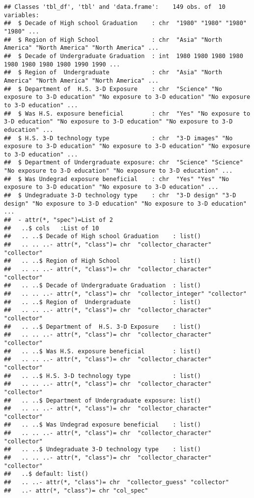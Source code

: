 \documentclass[]{article}
\begin{document}
\begin{verbatim}
## Classes 'tbl_df', 'tbl' and 'data.frame':    149 obs. of  10 variables:
##  $ Decade of High school Graduation    : chr  "1980" "1980" "1980" "1980" ...
##  $ Region of High School               : chr  "Asia" "North America" "North America" "North America" ...
##  $ Decade of Undergraduate Graduation  : int  1980 1980 1980 1980 1980 1980 1980 1980 1990 1990 ...
##  $ Region of  Undergraduate            : chr  "Asia" "North America" "North America" "North America" ...
##  $ Department of  H.S. 3-D Exposure    : chr  "Science" "No exposure to 3-D education" "No exposure to 3-D education" "No exposure to 3-D education" ...
##  $ Was H.S. exposure beneficial        : chr  "Yes" "No exposure to 3-D education" "No exposure to 3-D education" "No exposure to 3-D education" ...
##  $ H.S. 3-D technology type            : chr  "3-D images" "No exposure to 3-D education" "No exposure to 3-D education" "No exposure to 3-D education" ...
##  $ Department of Undergraduate exposure: chr  "Science" "Science" "No exposure to 3-D education" "No exposure to 3-D education" ...
##  $ Was Undegrad exposure beneficial    : chr  "Yes" "Yes" "No exposure to 3-D education" "No exposure to 3-D education" ...
##  $ Undegraduate 3-D technology type    : chr  "3-D design" "3-D design" "No exposure to 3-D education" "No exposure to 3-D education" ...
##  - attr(*, "spec")=List of 2
##   ..$ cols   :List of 10
##   .. ..$ Decade of High school Graduation    : list()
##   .. .. ..- attr(*, "class")= chr  "collector_character" "collector"
##   .. ..$ Region of High School               : list()
##   .. .. ..- attr(*, "class")= chr  "collector_character" "collector"
##   .. ..$ Decade of Undergraduate Graduation  : list()
##   .. .. ..- attr(*, "class")= chr  "collector_integer" "collector"
##   .. ..$ Region of  Undergraduate            : list()
##   .. .. ..- attr(*, "class")= chr  "collector_character" "collector"
##   .. ..$ Department of  H.S. 3-D Exposure    : list()
##   .. .. ..- attr(*, "class")= chr  "collector_character" "collector"
##   .. ..$ Was H.S. exposure beneficial        : list()
##   .. .. ..- attr(*, "class")= chr  "collector_character" "collector"
##   .. ..$ H.S. 3-D technology type            : list()
##   .. .. ..- attr(*, "class")= chr  "collector_character" "collector"
##   .. ..$ Department of Undergraduate exposure: list()
##   .. .. ..- attr(*, "class")= chr  "collector_character" "collector"
##   .. ..$ Was Undegrad exposure beneficial    : list()
##   .. .. ..- attr(*, "class")= chr  "collector_character" "collector"
##   .. ..$ Undegraduate 3-D technology type    : list()
##   .. .. ..- attr(*, "class")= chr  "collector_character" "collector"
##   ..$ default: list()
##   .. ..- attr(*, "class")= chr  "collector_guess" "collector"
##   ..- attr(*, "class")= chr "col_spec"
\end{verbatim}
\end{document}
